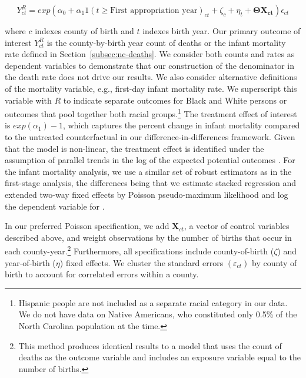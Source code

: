 \documentclass[12pt]{article}
\begin{document}
\vspace{-.25cm}
\begin{singlespace}
\begin{equation}
    Y^{R}_{ct} = exp(\alpha_0 + \alpha_1{1(t \geq \text{First appropriation year})_{ct}} + \zeta_c + \eta_t + \boldsymbol{\Theta} \mathbf{X_{ct}})\epsilon_{ct} \label{eq:short-run}
\end{equation}
\end{singlespace}
\noindent where $c$ indexes county of birth and $t$ indexes birth year.
Our primary outcome of interest $Y^{R}_{ct}$ is the county-by-birth year count of deaths or the infant mortality rate defined in Section~\ref{subsec:nc-deaths}. 
We consider both counts and rates as dependent variables to demonstrate that our construction of the denominator in the death rate does not drive our results. 
We also consider alternative definitions of the mortality variable, e.g., first-day infant mortality rate.
We superscript this variable with $R$ to indicate separate outcomes for Black and White persons or outcomes that pool together both racial groups.\footnote{Hispanic people are not included as a separate racial category in our data.
We do not have data on Native Americans, who constituted only 0.5\% of the North Carolina population at the time.} 
The treatment effect of interest is $exp(\alpha_1)-1$, which captures the percent change in infant mortality compared to the untreated counterfactual in our difference-in-differences framework. 
Given that the model is non-linear, the treatment effect is identified under the assumption of parallel trends in the log of the expected potential outcomes . 
For the infant mortality analysis, we use a similar set of robust estimators as in the first-stage analysis, the differences being that we estimate stacked regression and extended two-way fixed effects by Poisson pseudo-maximum likelihood and log the dependent variable for . 

In our preferred Poisson specification, we add $\mathbf{X}_{ct}$, a vector of control variables described above, and weight observations by the number of births that occur in each county-year.\footnote{
This method produces identical results to a model that uses the count of deaths as the outcome variable and includes an exposure variable equal to the number of births.
} 
Furthermore, all specifications include county-of-birth ($\zeta$) and year-of-birth ($\eta$) fixed effects.
We cluster the standard errors $(\varepsilon_{ct})$ by county of birth to account for correlated errors within a county.
\end{document}
